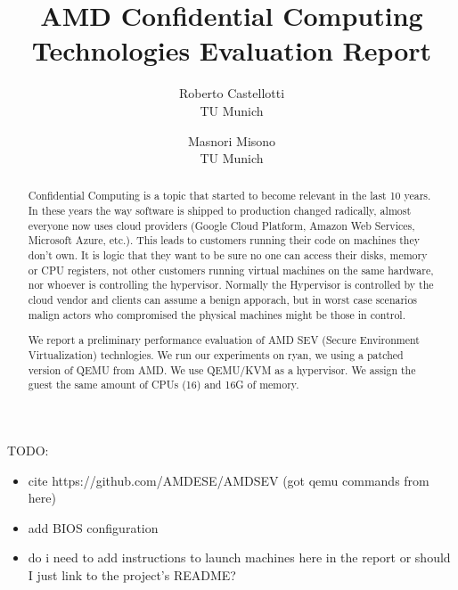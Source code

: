 \documentclass[twocolumn]{article}
\begin{document}
\date{}
\title{\Large \bf AMD Confidential Computing Technologies Evaluation Report}
\author{{\rm Roberto Castellotti}\\TU Munich \and {\rm Masnori Misono}\\TU Munich}
\maketitle

TODO:
\begin{itemize}
    \item cite https://github.com/AMDESE/AMDSEV (got qemu commands from here)
    \item add BIOS configuration
    \item do i need to add instructions to launch machines here in the report or should I just link to the project's README?
\end{itemize}

\begin{abstract}
    Confidential Computing is a topic that started to become relevant in the last 10 years. In these years the way software is shipped to production changed radically, almost everyone now uses cloud providers (Google Cloud Platform, Amazon Web Services, Microsoft Azure, etc.). This leads to customers running their code on machines they don't own. It is logic that they want to be sure no one can access their disks, memory or CPU registers, not other customers running virtual machines on the same hardware, nor whoever is controlling the hypervisor. Normally the Hypervisor is controlled by the cloud vendor and clients can assume a benign apporach, but in worst case scenarios malign actors who compromised the physical machines might be those in control.
    \par
    We report a preliminary performance evaluation of AMD SEV (Secure Environment Virtualization) technlogies.
    We run our experiments on ryan, we using a patched version of QEMU from AMD. We use QEMU/KVM as a hypervisor. We assign the guest the same amount of CPUs (16) and 16G of memory.    
\end{abstract}
\end{document}
